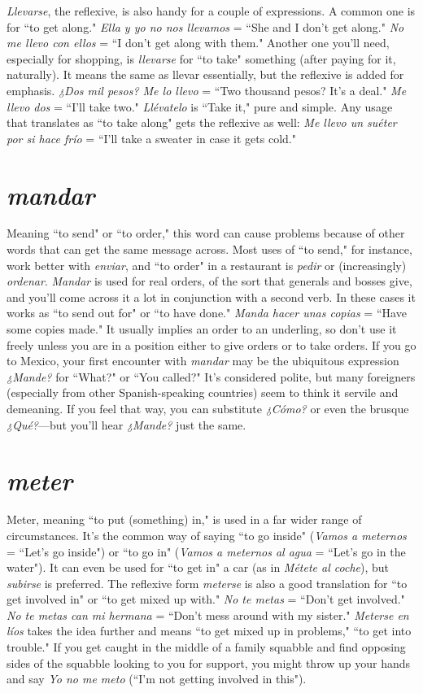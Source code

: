 \emph{Llevarse}, the reflexive, is also handy for a couple of expressions. A common one is for ``to get along." \emph{Ella y yo no nos llevamos}
= ``She and I don't get along." \emph{No me llevo con ellos} = ``I don't get
along with them." Another one you'll need, especially for shopping,
is \emph{llevarse} for ``to take" something (after paying for it, naturally). It
means the same as llevar essentially, but the reflexive is added for emphasis. \emph{¿Dos mil pesos? Me lo llevo} = ``Two thousand pesos? It's a
deal." \emph{Me llevo dos} = ``I'll take two." \emph{Llévatelo} is ``Take it," pure and
simple. Any usage that translates as ``to take along" gets the reflexive
as well: \emph{Me llevo un suéter por si hace frío} = ``I'll take a sweater in
case it gets cold."

\section{\emph{mandar}}

Meaning ``to send" or ``to order," this word can cause problems because of other words that can get the same message across.
Most uses of ``to send," for instance, work better with \emph{enviar}, and ``to
order" in a restaurant is \emph{pedir} or (increasingly) \emph{ordenar}. \emph{Mandar} is
used for real orders, of the sort that generals and bosses give, and you'll
come across it a lot in conjunction with a second verb. In these cases
it works as ``to send out for" or ``to have done." \emph{Manda hacer unas copias} = ``Have some copies made." It usually implies an order to an underling, so don't use it freely unless you are in a position either to give
orders or to take orders. If you go to Mexico, your first encounter with
\emph{mandar} may be the ubiquitous expression \emph{¿Mande?} for ``What?" or
``You called?" It's considered polite, but many foreigners (especially
from other Spanish-speaking countries) seem to think it servile and demeaning. If you feel that way, you can substitute \emph{¿Cómo?} or even the
brusque \emph{¿Qué?}---but you'll hear \emph{¿Mande?} just the same.

\section{\emph{meter}}

Meter, meaning ``to put (something) in," is used in a far wider
range of circumstances. It's the common way of saying ``to go inside"
(\emph{Vamos a meternos} = ``Let's go inside") or ``to go in" (\emph{Vamos a meternos al agua} = ``Let's go in the water"). It can even be used for ``to get
in" a car (as in \emph{Métete al coche}), but \emph{subirse} is preferred. The reflexive
form \emph{meterse} is also a good translation for ``to get involved in" or ``to
get mixed up with." \emph{No te metas} = ``Don't get involved." \emph{No te metas
can mi hermana} = ``Don't mess around with my sister." \emph{Meterse en
líos} takes the idea further and means ``to get mixed up in problems,"
``to get into trouble." If you get caught in the middle of a family
squabble and find opposing sides of the squabble looking to you for
support, you might throw up your hands and say \emph{Yo no me meto} (``I'm
not getting involved in this").

